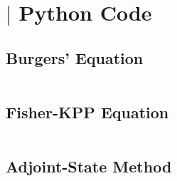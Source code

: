 \chapter{$\vert$ Python Code}
\label{chap:appb}

\section*{Burgers' Equation}
\label{sec:burgers_code}

\captionsetup{type=listing}  
\label{lst:burgers}
\inputminted{python}{code/burgers.py}

\section*{Fisher-KPP Equation}
\label{sec:fkpp_code}

\captionsetup{type=listing}  
\label{lst:fkpp}
\inputminted{python}{code/fkpp.py}

\section*{Adjoint-State Method}
\label{sec:adjoint_code}

\captionsetup{type=listing}  
\label{lst:adjoint}
\inputminted{python}{code/adjoint.py}






